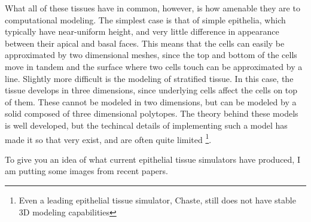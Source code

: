 What all of these tissues have in common, however, is how amenable they are to computational modeling. The simplest case is that of simple epithelia, which typically have near-uniform height, and very little difference in appearance between their apical and basal faces. This means that the cells can easily be approximated by two dimensional meshes, since the top and bottom of the cells move in tandem and the surface where two cells touch can be approximated by a line. Slightly more difficult is the modeling of stratified tissue. In this case, the tissue develops in three dimensions, since underlying cells affect the cells on top of them. These cannot be modeled in two dimensions, but can be modeled by a solid composed of three dimensional polytopes. The theory behind these models is well developed, but the techincal details of implementing such a model has made it so that very exist, and are often quite limited \footnote{Even a leading epithelial tissue simulator, Chaste, still does not have stable 3D modeling capabilities}. 

To give you an idea of what current epithelial tissue simulators have produced, I am putting some images from recent papers.

